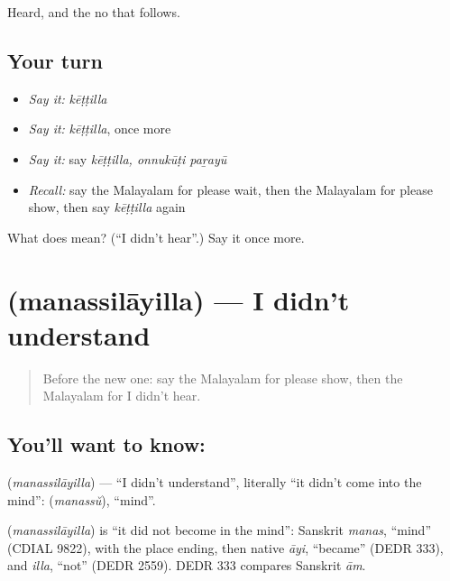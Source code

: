 \begin{grammarlens}[title={What you've built}]
Heard, and the no that follows.
\end{grammarlens}

\subsection*{Your turn}
\begin{itemize}
\raggedright
  \item \emph{Say it:} \emph{kēṭṭilla}
  \item \emph{Say it:} \emph{kēṭṭilla}, once more
  \item \emph{Say it:} say \emph{kēṭṭilla, onnukūṭi paṟayū}
  \item \emph{Recall:} say the Malayalam for please wait, then the Malayalam for please show, then say \emph{kēṭṭilla} again
\end{itemize}

\begin{tcolorbox}[breakable,colback=teal!4,colframe=teal!35!black,title={Before you move on}]
What does  mean? (\textquotedblleft{}I didn't hear\textquotedblright{}.) Say it once more.
\end{tcolorbox}
\section[\texorpdfstring{\ml{മനസ്സിലായില്ല} (manassilāyilla)}{മനസ്സിലായില്ല (manassilāyilla)}]{ (manassilāyilla) — I didn't understand}

\label{lesson:ML-C120-didntunderstand}



\begin{quote}
Before the new one: say the Malayalam for please show, then the Malayalam for I didn't hear.
\end{quote}

\subsection*{You'll want to know: }
\textbf{} (\emph{manassilāyilla}) — \textquotedblleft{}I didn't understand\textquotedblright{}, literally \textquotedblleft{}it didn't come into the mind\textquotedblright{}: \textbf{} (\emph{manassŭ}), \textquotedblleft{}mind\textquotedblright{}.

\begin{cousinweb}
\textbf{} (\emph{manassilāyilla}) is \textquotedblleft{}it did not become in the mind\textquotedblright{}: Sanskrit \emph{manas}, \textquotedblleft{}mind\textquotedblright{} (CDIAL 9822), with the place ending, then native \emph{āyi}, \textquotedblleft{}became\textquotedblright{} (DEDR 333), and \emph{illa}, \textquotedblleft{}not\textquotedblright{} (DEDR 2559). DEDR 333 compares Sanskrit \emph{ām}.
\end{cousinweb}

